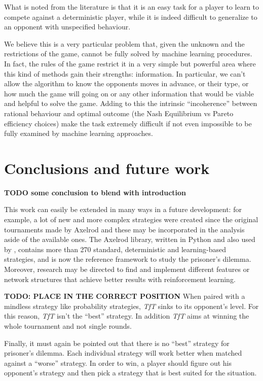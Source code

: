 \documentclass[journal,a4paper,10pt,twoside]{IEEEtran} %
\begin{document}
What is noted from the literature is that it is an easy task for a player to learn to compete against a deterministic player, while it is indeed difficult to generalize to an opponent with unspecified behaviour.

We believe this is a very particular problem that, given the unknown and the restrictions of the game, cannot be fully solved by machine learning procedures. In fact, the rules of the game restrict it in a very simple but powerful area where this kind of methods gain their strengths: information. In particular, we can't allow the algorithm to know the opponents moves in advance, or their type, or how much the game will going on or any other information that would be viable and helpful to solve the game. Adding to this the intrinsic ``incoherence'' between rational behaviour and optimal outcome (the Nash Equilibrium vs Pareto efficiency choices) make the task extremely difficult if not even impossible to be fully examined by machine learning approaches.

\section{Conclusions and future work} \label{s:conc}
\textbf{TODO some conclusion to blend with introduction}

This work can easily be extended in many ways in a future development: for example, a lot of new and more complex strategies were created since the original tournaments made by Axelrod and these may be incorporated in the analysis aside of the available ones.
The Axelrod library, \cite{Knight2016Axel,axel-lib} written in Python and also used by \cite{plosRLdominant}, contains more than 270 standard, deterministic and learning-based strategies, and is now the reference framework to study the prisoner's dilemma.
Moreover, research may be directed to find and implement different features or network structures that achieve better results with reinforcement learning.

\textbf{TODO: PLACE IN THE CORRECT POSITION}
When paired with a mindless strategy like probability strategies, \textit{TfT} sinks to its opponent's level. For this reason, \textit{TfT} isn't the ``best'' strategy. In addition \textit{TfT} aims at winning the whole tournament and not single rounds.

Finally, it must again be pointed out that there is no ``best'' strategy for prisoner's dilemma. Each individual strategy will work better when matched against a ``worse'' strategy. In order to win, a player should figure out his opponent's strategy and then pick a strategy that is best suited for the situation.
\end{document}

